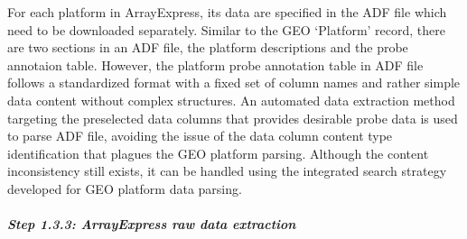 For each platform in ArrayExpress, its data are specified in the ADF file
which need to be downloaded separately.
%
Similar to the GEO `Platform' record, there are two sections in an ADF file,
the platform descriptions and the probe annotaion table.
%
However, the platform probe annotation table in ADF file follows a
standardized format with a fixed set of column names and rather simple
data content without complex structures.
%
An automated data extraction method targeting the preselected data
columns that provides desirable probe data is used to parse ADF file,
avoiding the issue of the data column content type identification that
plagues the GEO platform parsing.
%
Although the content inconsistency still exists, it can be handled using
the integrated search strategy developed for GEO platform data parsing.




\subparagraph{Step 1.3.3: ArrayExpress raw data extraction}

% 
%
%

